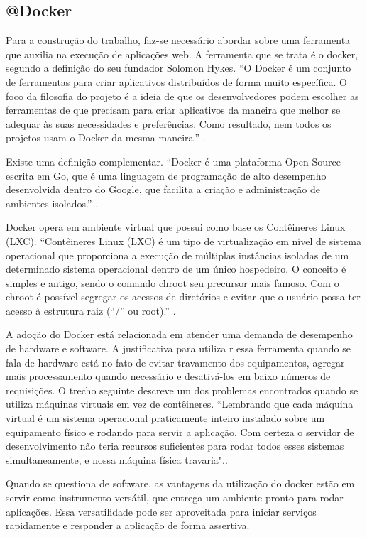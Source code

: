 \subsection{@Docker}\label{docker}
Para a construção do trabalho, faz-se necessário abordar sobre uma ferramenta que auxilia na execução de aplicações web.
A ferramenta que se trata é o docker, segundo a definição do seu fundador Solomon Hykes.
“O Docker é um conjunto de ferramentas para criar aplicativos distribuídos de forma muito específica. O foco da filosofia
do projeto é a ideia de que os desenvolvedores podem escolher as ferramentas de que precisam para criar aplicativos da
maneira que melhor se adequar às suas necessidades e preferências. Como resultado, nem todos os projetos usam o Docker
da mesma maneira.” \cite {solomon-hykes}.


Existe uma definição complementar. “Docker é uma plataforma Open Source escrita em Go, que é uma linguagem de
programação de alto desempenho desenvolvida dentro do Google, que facilita a criação e administração de ambientes isolados.”
\cite {mundodocker-01}.


Docker opera em ambiente virtual que possui como base os Contêineres Linux (LXC). “Contêineres Linux (LXC) é um tipo de
virtualização em nível de sistema operacional que proporciona a execução de múltiplas instâncias isoladas de um determinado
sistema operacional dentro de um único hospedeiro. O conceito é simples e antigo, sendo o comando chroot seu precursor mais
famoso. Com o chroot é possível segregar os acessos de diretórios e evitar que o usuário possa ter acesso à estrutura raiz
(“/” ou root).” \cite {sinestec-01}.


A adoção do Docker está relacionada em atender uma demanda de desempenho de hardware e software. A justificativa para utiliza
r essa ferramenta quando se fala de hardware está no fato de evitar travamento dos equipamentos, agregar mais processamento
quando necessário e desativá-los em baixo números de requisições.
O trecho seguinte descreve um dos problemas encontrados quando se utiliza máquinas virtuais em vez de contêineres. “Lembrando
que cada máquina virtual é um sistema operacional praticamente inteiro instalado sobre um equipamento físico e rodando para
servir a aplicação. Com certeza o servidor de desenvolvimento não teria recursos suficientes para rodar todos esses sistemas
simultaneamente, e nossa máquina física travaria".\cite {aprendendo-docker}.


Quando se questiona de software, as vantagens da utilização do docker estão em servir como instrumento versátil, que entrega
um ambiente pronto para rodar aplicações. Essa versatilidade pode ser aproveitada para iniciar serviços rapidamente e responder
a aplicação de forma assertiva.


